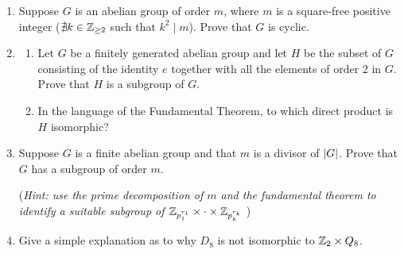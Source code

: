 \begin{exercises}
\begin{enumerate}
	\item Suppose $G$ is an abelian group of order $m$, where $m$ is a square-free positive integer ($\nexists k\in \mathbb{Z}_{\ge 2}$ such that $k^2\!\mid\! m$). Prove that $G$ is cyclic.


	\item\begin{enumerate}
  	\item Let $G$ be a finitely generated abelian group and let $H$ be the subset of $G$ consisting of the identity $e$ together with all the elements of order 2 in $G$. Prove that $H$ is a subgroup of $G$.
  	\item In the language of the Fundamental Theorem, to which direct product is $H$ isomorphic?
	\end{enumerate}
	
	
	\item\label{exs:abeliansubgroup} Suppose $G$ is a finite abelian group and that $m$ is a divisor of $\left| G\right|$. Prove that $G$ has a subgroup of order $m$.\par
	(\emph{Hint: use the prime decomposition of $m$ and the fundamental theorem to identify a suitable subgroup of $\mathbb{Z}_{p_1^{r_1}}\times\cdot\times\mathbb{Z}_{p_k^{r_k}}$ })
	
	
	\item Give a simple explanation as to why $D_8$ is not isomorphic to $\mathbb{Z}_2\times Q_8$.
	
% 	

\end{enumerate}
\end{exercises}


